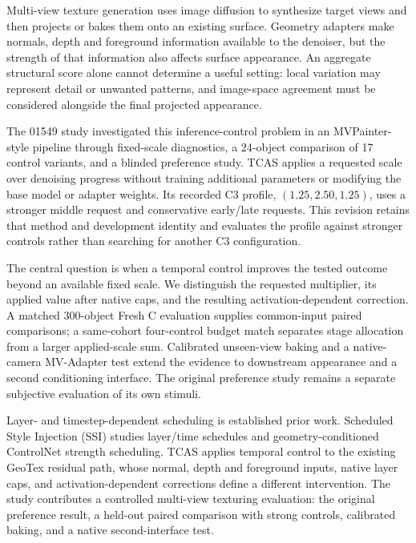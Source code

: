 \documentclass[times,twocolumn,final]{elsarticle}
\providecommand{\DIFadd}[1]{{\protect\color{blue} \sf #1}} %
\providecommand{\DIFaddbegin}{} %
\providecommand{\DIFaddend}{} %
\begin{document}
 
 \DIFaddbegin \DIFadd{Multi-view texture generation uses image diffusion to synthesize target views and then projects or bakes them onto an existing surface. Geometry adapters make normals, depth and foreground information available to the denoiser, but the strength of that information also affects surface appearance. An aggregate structural score alone cannot determine a useful setting: local variation may represent detail or unwanted patterns, }\DIFaddend and   \DIFaddbegin \DIFadd{image-space agreement must be considered alongside the final projected appearance}\DIFaddend .

 
 \DIFaddbegin \DIFadd{The 01549 study investigated this inference-control problem in an MVPainter-style pipeline through fixed-scale diagnostics, a 24-object comparison of 17 control variants, and a blinded preference study. TCAS applies a requested scale over denoising progress without training additional parameters or modifying the base model or adapter weights. Its recorded C3 profile, $(1.25,2.50,1.25)$, uses a stronger middle request and conservative early/late requests. This revision retains that method and development identity and evaluates the profile against stronger controls rather than searching for another C3 configuration.
}\DIFaddend 

  \DIFaddbegin \DIFadd{The central question is when a temporal control improves the tested outcome beyond an available fixed scale. We distinguish the requested multiplier, its applied value after native caps, and the resulting activation-dependent correction. A matched 300-object Fresh C evaluation supplies common-input paired comparisons; a same-cohort four-control budget match separates stage allocation from a larger applied-scale sum. Calibrated unseen-view baking and a native-camera MV-Adapter test extend the evidence to downstream appearance and a second conditioning interface. The original preference study remains a separate subjective evaluation of its own stimuli}\DIFaddend .

 
 \DIFaddbegin \DIFadd{Layer- and timestep-dependent scheduling is established prior work. Scheduled Style Injection (SSI) studies layer/time schedules and geometry-conditioned ControlNet strength scheduling. TCAS applies temporal control to the existing GeoTex residual path, whose normal, depth and foreground inputs, native layer caps, and activation-dependent corrections define a different intervention. The study contributes a controlled }\DIFaddend multi-view   \DIFaddbegin \DIFadd{texturing evaluation: the original preference result, a held-out paired comparison with strong controls, calibrated baking, and a native second-interface test}\DIFaddend .
\end{document}
